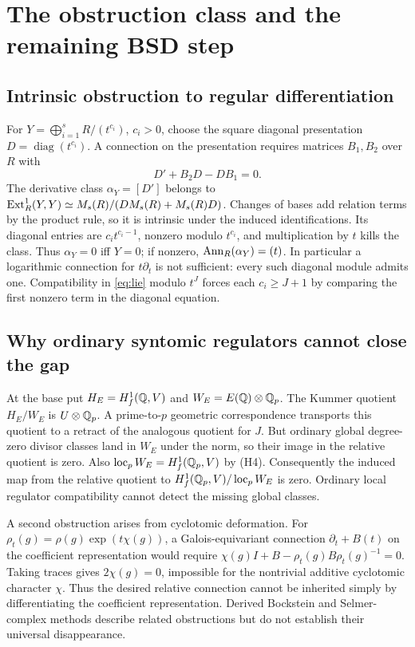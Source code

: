 \documentclass[11pt,a4paper]{article}
\begin{document}
\section{The obstruction class and the remaining BSD step}
\subsection{Intrinsic obstruction to regular differentiation}
For $Y=\bigoplus_{i=1}^s R/(t^{c_i})$, $c_i>0$, choose the square diagonal presentation $D=\operatorname{diag}(t^{c_i})$. A connection on the presentation requires matrices $B_1,B_2$ over $R$ with
\begin{equation}\label{eq:lie}
D'+B_2D-DB_1=0.
\end{equation}
The derivative class $\alpha_Y=[D']$ belongs to $\operatorname{Ext}^1_R(Y,Y)\simeq M_s(R)/(DM_s(R)+M_s(R)D)$. Changes of bases add relation terms by the product rule, so it is intrinsic under the induced identifications. Its diagonal entries are $c_it^{c_i-1}$, nonzero modulo $t^{c_i}$, and multiplication by $t$ kills the class. Thus $\alpha_Y=0$ iff $Y=0$; if nonzero, $\operatorname{Ann}_R(\alpha_Y)=(t)$. In particular a logarithmic connection for $t\partial_t$ is not sufficient: every such diagonal module admits one. Compatibility in \eqref{eq:lie} modulo $t^J$ forces each $c_i\geq J+1$ by comparing the first nonzero term in the diagonal equation.

\subsection{Why ordinary syntomic regulators cannot close the gap}
At the base put $H_E=H^1_f(\mathbb Q,V)$ and $W_E=E(\mathbb Q)\otimes\mathbb Q_p$. The Kummer quotient $H_E/W_E$ is $U\otimes\mathbb Q_p$. A prime-to-$p$ geometric correspondence transports this quotient to a retract of the analogous quotient for $J$. But ordinary global degree-zero divisor classes land in $W_E$ under the norm, so their image in the relative quotient is zero. Also $\operatorname{loc}_p W_E=H_f^1(\mathbb Q_p,V)$ by (H4). Consequently the induced map from the relative quotient to $H_f^1(\mathbb Q_p,V)/\operatorname{loc}_p W_E$ is zero. Ordinary local regulator compatibility cannot detect the missing global classes.

A second obstruction arises from cyclotomic deformation. For $\rho_t(g)=\rho(g)\exp(t\chi(g))$, a Galois-equivariant connection $\partial_t+B(t)$ on the coefficient representation would require $\chi(g)I+B-\rho_t(g)B\rho_t(g)^{-1}=0$. Taking traces gives $2\chi(g)=0$, impossible for the nontrivial additive cyclotomic character $\chi$. Thus the desired relative connection cannot be inherited simply by differentiating the coefficient representation. Derived Bockstein and Selmer-complex methods \cite{nekovar,mazurrubin,sano,bks} describe related obstructions but do not establish their universal disappearance.
\end{document}
